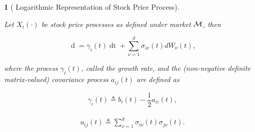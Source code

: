 \documentclass[british]{amsart} \usepackage{lmodern}
\numberwithin{equation}{section} \numberwithin{figure}{section}
\theoremstyle{plain} \newtheorem{thm}{\protect\theoremname}[section]
\theoremstyle{definition} \newtheorem{defn}[thm]{\protect\definitionname}
\theoremstyle{plain} \newtheorem{assumption}[thm]{\protect\assumptionname}
\theoremstyle{plain} \newtheorem{lem}[thm]{\protect\lemmaname}
\theoremstyle{plain} \newtheorem{prop}[thm]{\protect\propositionname}
\theoremstyle{remark} \newtheorem{rem}[thm]{\protect\remarkname}
\theoremstyle{plain} \newtheorem{cor}[thm]{\protect\corollaryname}
\renewcommand{\d}[1]{\mathop{\mathrm{d}{#1}}}
\newcommand{\defeq}{\mathop{\triangleq}} \newcommand{\almostsurely}{\text{a.s.}}
\begin{document}
\begin{prop} [
  {\cite[Equation 1.5]{fernholz2009}} 
  Logarithmic Representation of Stock Price Process]
  \label{thm:logarithmicrepresentation}

  Let $X_{i}(\cdot)$ be stock price processes as defined under market $\mathcal{M}$,
  then

  \begin{equation}
    \label{eq:dlogX}
        \d{\log{X_{i}(t)}} =
          \gamma_{i}(t) \d{t} +
          \sum_{\nu=1}^{d} \sigma_{i\nu}(t) dW_{\nu}(t),
  \end{equation}

  where the process $\gamma_{i}(t)$, called the \textit{growth rate}, and the
  (non-negative definite matrix-valued) \textit{covariance process} $a_{ij}(t)$
  are defined as

  \begin{equation}
    \label{eq:gamma}
    \gamma_{i}(t)\defeq b_{i}(t)-\frac{1}{2}a_{ii}(t),
  \end{equation}

  \begin{gather}
    \label{eq:covarianceprocess}
    \begin{split}
      a_{ij}(t)
         \defeq \sum_{\nu=1}^{d}\sigma_{i\nu}(t)\sigma_{j\nu}(t).
    \end{split}
  \end{gather}

\end{prop}
\end{document}
